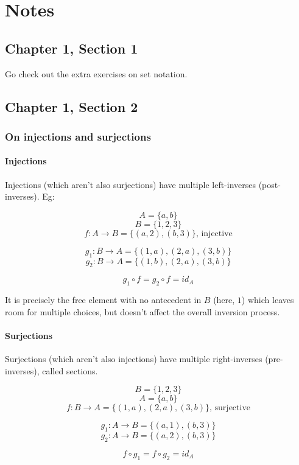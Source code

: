 \documentclass[12pt, letterpaper, twoside]{report}
\begin{document}
\newpage
\part{Notes}
\chapter*{Chapter 1, Section 1}

Go check out the extra exercises on set notation.
\chapter*{Chapter 1, Section 2}

\section*{On injections and surjections}

\subsection*{Injections}

Injections (which aren't also surjections) have multiple left-inverses (post-inverses). Eg:

$$A = \{ a, b    \}$$
$$B = \{ 1, 2, 3 \}$$
$$f : A \to B = \{ (a, 2), (b, 3) \} \text{, injective}$$

$$g_1 : B \to A = \{ (1, a), (2, a), (3, b) \}$$
$$g_2 : B \to A = \{ (1, b), (2, a), (3, b) \}$$

$$g_1 \circ f = g_2 \circ f = id_A$$

It is precisely the free element with no antecedent in $B$ (here, $1$) which leaves room for multiple choices, but doesn't affect the overall inversion process.


\subsection*{Surjections}

Surjections (which aren't also injections) have multiple right-inverses (pre-inverses), called sections.



$$B = \{ 1, 2, 3 \}$$
$$A = \{ a, b    \}$$
$$f : B \to A = \{ (1, a), (2, a), (3, b) \} \text{, surjective}$$

$$g_1 : A \to B = \{(a, 1), (b, 3) \}$$
$$g_2 : A \to B = \{(a, 2), (b, 3) \}$$

$$f \circ g_1 = f \circ g_2 = id_A$$
\end{document}

